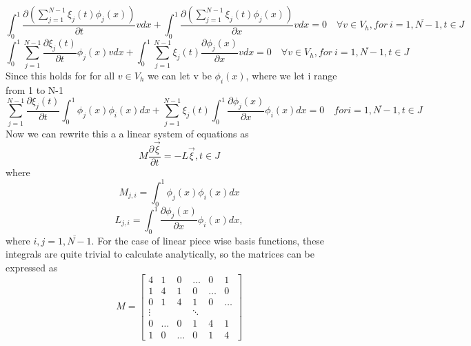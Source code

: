 \documentclass[a4paper,10pt,twoside]{article}
\begin{document}
\begin{itemize}
\begin{equation}
    \int_0^1 \frac{\partial \left(\sum\limits_{j=1}^{N-1} \xi_j(t)\phi_j(x)\right)}{\partial t}v dx+ \int_0^1 \frac{\partial \left(\sum\limits_{j=1}^{N-1} \xi_j(t)\phi_j(x)\right)}{\partial x}v dx= 0 \quad\forall v \in V_h,for\ i=\overline{1,N-1}, t \in J
    \label{eq_8}
\end{equation}
\begin{equation}
    \int_0^1 \sum\limits_{j=1}^{N-1} \frac{\partial\xi_j(t)}{\partial t}\phi_j(x)v dx+ \int_0^1  \sum\limits_{j=1}^{N-1} \xi_j(t)\frac{\partial\phi_j(x)}{\partial x}v dx= 0 \quad\forall v \in V_h,for\ i=\overline{1,N-1}, t \in J
    \label{eq_9}
\end{equation}
Since this holds for for all $v \in V_h$ we can let v be $\phi_i(x)$, where we let i range from 1 to N-1
\begin{equation}
    \sum _{ j=1 }^{ N-1 } \frac { \partial \xi _{ j }(t) }{ \partial t } \int _{ 0 }^{ 1 } \phi _{ j }(x)\phi _{ i }(x)dx+\sum _{ j=1 }^{ N-1 } \xi _{ j }(t)\int _{ 0 }^{ 1 } \frac { \partial \phi _{ j }(x) }{ \partial x } \phi _{ i }(x)dx=0\quad for i=\overline { 1,N-1 } ,t\in J
\label{eq_10}
\end{equation}
Now we can rewrite this a a linear system of equations as
\begin{equation}
    M\frac{\partial \Vec{\xi}}{\partial t} = -L\Vec{\xi},t\in J
    \label{eq_11}
\end{equation}
where
\begin{equation}
    M_{j,i} = \int_0^1\phi_j(x)\phi_i(x)dx
     \label{eq_12}
\end{equation}
\begin{equation}
    L_{j,i} = \int_0^1\frac{\partial\phi_j(x)}{\partial x}\phi_i(x)dx,
     \label{eq_13}
\end{equation}
where $i,j =\overline { 1,N-1 }$. For the case of linear piece wise basis functions, these integrals are quite trivial to calculate analytically, so the matrices can be expressed as
\begin{equation}
    M = \begin{bmatrix}
        4& 1& 0& \dots& 0& 1\\
        1& 4& 1& 0& \dots& 0\\
        0& 1& 4& 1& 0& \dots\\
        \vdots&&&\ddots\\
        0& \dots& 0& 1& 4& 1\\
        1& 0& \dots& 0& 1& 4

\end{bmatrix}
\end{equation}
\end{itemize}
\end{document}
